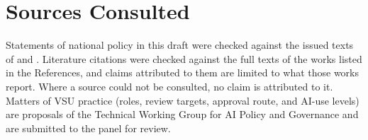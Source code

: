 \section{Sources Consulted}\label{app:verification}

Statements of national policy in this draft were checked against the issued texts of \cmo{} \citep{cmo21} and \rmo{} \citep{rmo318}. Literature citations were checked against the full texts of the works listed in the References, and claims attributed to them are limited to what those works report. Where a source could not be consulted, no claim is attributed to it. Matters of VSU practice (roles, review targets, approval route, and AI-use levels) are proposals of the Technical Working Group for AI Policy and Governance and are submitted to the panel for review.
